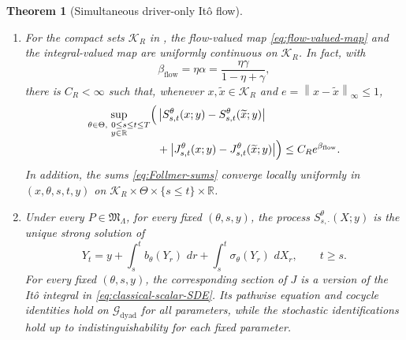 \documentclass[11pt,reqno]{amsart}
\theoremstyle{plain}
\newtheorem{theorem}{Theorem}[section]
\theoremstyle{definition}
\newcommand{\R}{\mathbb R}
\newcommand{\cG}{\mathcal G}
\newcommand{\cK}{\mathcal K}
\newcommand{\dd}{\,d}
\newcommand{\norm}[1]{\left\lVert #1\right\rVert}
\newcommand{\abs}[1]{\left\lvert #1\right\rvert}
\begin{document}
\begin{theorem}[Simultaneous driver-only It\^o flow]
\begin{enumerate}[label=(\roman*),leftmargin=2.2em]
  \item For the compact sets \(\cK_R\) in
  , the flow-valued map
  \eqref{eq:flow-valued-map} and the integral-valued map are uniformly
  continuous on \(\cK_R\).  In fact, with
  \begin{equation}\label{eq:flow-holder-exponent}
    \beta_{\mathrm{flow}}
    =\eta\alpha
    =\frac{\eta\gamma}{1-\eta+\gamma},
  \end{equation}
  there is \(C_R<\infty\) such that, whenever
  \(x,\widetilde x\in\cK_R\) and
  \(e=\norm{x-\widetilde x}_\infty\le1\),
  \begin{align}
    \sup_{\substack{\theta\in\Theta,\ 0\le s\le t\le T\\y\in\R}}
    \Bigl(&
      \abs{S_{s,t}^\theta(x;y)-S_{s,t}^\theta(\widetilde x;y)}
      \notag\\[-0.2em]
      &+
      \abs{J_{s,t}^\theta(x;y)-J_{s,t}^\theta(\widetilde x;y)}
    \Bigr)
    \le C_Re^{\beta_{\mathrm{flow}}}.
    \label{eq:flow-raw-holder}
  \end{align}
  In addition, the sums \eqref{eq:Follmer-sums} converge locally uniformly in
  \((x,\theta,s,t,y)\) on
  \(\cK_R\times\Theta\times\{s\le t\}\times\R\).

  \item Under every \(P\in\mathfrak M_\Lambda\), for every fixed
  \((\theta,s,y)\), the process
  \(S_{s,\cdot}^\theta(X;y)\) is the unique strong solution of
  \begin{equation}\label{eq:classical-scalar-SDE}
    Y_t
    =y+\int_s^t b_\theta(Y_r)\,\dd r
       +\int_s^t\sigma_\theta(Y_r)\,\dd X_r,
    \qquad t\ge s.
  \end{equation}
  For every fixed \((\theta,s,y)\), the corresponding section of \(J\) is a
  version of the It\^o integral in \eqref{eq:classical-scalar-SDE}.  Its
  pathwise equation and cocycle identities hold on
  \(\cG_{\mathrm{dyad}}\) for all parameters, while the stochastic
  identifications hold up to indistinguishability for each fixed parameter.
\end{enumerate}
\end{theorem}
\end{document}
